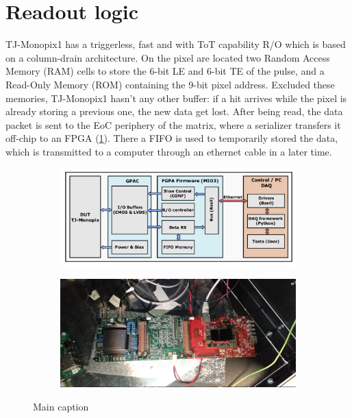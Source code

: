 \section{Readout logic}
    TJ-Monopix1 has a triggerless, fast and with ToT capability R/O which is based on a column-drain architecture.      
    On the pixel are located two Random Access Memory (RAM) cells to store the 6-bit LE and 6-bit TE of the pulse, and a Read-Only Memory (ROM) containing the 9-bit pixel address. Excluded these memories, TJ-Monopix1 hasn't any other buffer: if a hit arrives while the pixel is already storing a previous one, the new data get lost.  
    After being read, the data packet is sent to the EoC periphery of the matrix, where a serializer transfers it off-chip to an FPGA (\ref{fig:R/O-system}). There a FIFO is used to temporarily stored the data, which is transmitted to a computer through an ethernet cable in a later time.  
    \begin{figure}
        \begin{subfigure}{\textwidth}
        \centering
        \includegraphics[clip,width=0.8\linewidth]{figures/Monopix1/schematic_boards.png}
        \end{subfigure}
        \bigskip
        \begin{subfigure}{\textwidth}
        \centering    
        \includegraphics[clip,width=0.8\linewidth]{figures/Monopix1/monopix1_front.jpeg}
        \end{subfigure}
        \caption{Main caption}
        \label{fig:R/O-system}
    \end{figure}


